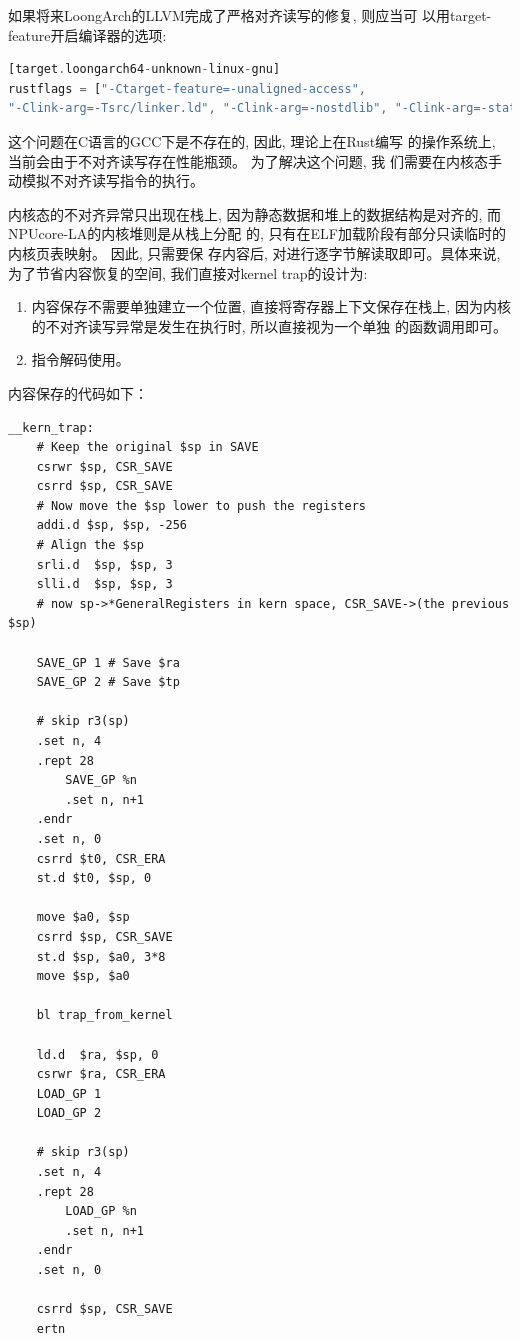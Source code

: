 如果将来LoongArch的LLVM完成了严格对齐读写的修复, 则应当可
以用target-feature开启编译器的选项:
\begin{lstlisting}[language={rust}, label={code:entry},
	caption={la64/entry.asm}]
[target.loongarch64-unknown-linux-gnu]
rustflags = ["-Ctarget-feature=-unaligned-access",
"-Clink-arg=-Tsrc/linker.ld", "-Clink-arg=-nostdlib", "-Clink-arg=-static"]
\end{lstlisting}
这个问题在C语言的GCC下是不存在的, 因此, 理论上在Rust编写
的操作系统上, 当前会由于不对齐读写存在性能瓶颈。 为了解决这个问题, 我
们需要在内核态手动模拟不对齐读写指令的执行。

内核态的不对齐异常只出现在栈上, 因为静态数据和堆上的数据结构是对齐的, 而NPUcore-LA的内核堆则是从栈上分配
的, 只有在ELF加载阶段有部分只读临时的内核页表映射。 因此, 只需要保
存内容后, 对进行逐字节解读取即可。具体来说, 为了节省内容恢复的空间, 我们直接对kernel trap的设计为:
\begin{enumerate}
    \item 内容保存不需要单独建立一个位置, 直接将寄存器上下文保存在栈上,
    因为内核的不对齐读写异常是发生在执行时, 所以直接视为一个单独
    的函数调用即可。
    \item 指令解码使用。
\end{enumerate}

内容保存的代码如下：
\begin{lstlisting}[language={riscv}, label={code:trap},
	caption={la64/trap/trap.S}]
    __kern_trap:
    # Keep the original $sp in SAVE
    csrwr $sp, CSR_SAVE    
    csrrd $sp, CSR_SAVE
    # Now move the $sp lower to push the registers
    addi.d $sp, $sp, -256
    # Align the $sp
    srli.d  $sp, $sp, 3
    slli.d  $sp, $sp, 3
    # now sp->*GeneralRegisters in kern space, CSR_SAVE->(the previous $sp)

    SAVE_GP 1 # Save $ra
    SAVE_GP 2 # Save $tp

    # skip r3(sp)
    .set n, 4
    .rept 28
        SAVE_GP %n
        .set n, n+1
    .endr
    .set n, 0
    csrrd $t0, CSR_ERA
    st.d $t0, $sp, 0

    move $a0, $sp
    csrrd $sp, CSR_SAVE
    st.d $sp, $a0, 3*8
    move $sp, $a0

    bl trap_from_kernel

    ld.d  $ra, $sp, 0
    csrwr $ra, CSR_ERA
    LOAD_GP 1
    LOAD_GP 2

    # skip r3(sp)
    .set n, 4
    .rept 28
        LOAD_GP %n
        .set n, n+1
    .endr
    .set n, 0
    
    csrrd $sp, CSR_SAVE
    ertn
\end{lstlisting}


